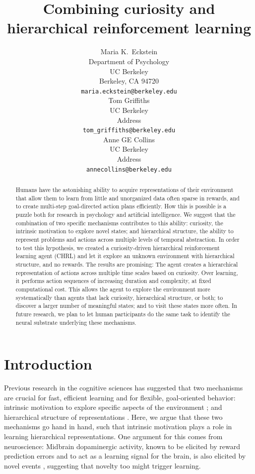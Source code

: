 \documentclass{article}
\title{Combining curiosity and hierarchical reinforcement learning}
\author{
  Maria K.~Eckstein \\
  Department of Psychology \\
  UC Berkeley \\
  Berkeley, CA 94720 \\
  \texttt{maria.eckstein@berkeley.edu} \\  
  \And
  Tom Griffiths \\
  UC Berkeley \\
  Address \\
  \texttt{tom_griffiths@berkeley.edu} \\
  \And
  Anne GE Collins \\
  UC Berkeley \\
  Address \\
  \texttt{annecollins@berkeley.edu} \\
}
\begin{document}
\maketitle

\begin{abstract}
    Humans have the astonishing ability to acquire representations of their environment that allow them to learn from little and unorganized data often sparse in rewards, and to create multi-step goal-directed action plans efficiently. How this is possible is a puzzle both for research in psychology and artificial intelligence. We suggest that the combination of two specific mechanisms contributes to this ability: curiosity, the intrinsic motivation to explore novel states; and hierarchical structure, the ability to represent problems and actions across multiple levels of temporal abstraction. In order to test this hypothesis, we created a curiosity-driven hierarchical reinforcement learning agent (CHRL) and let it explore an unknown environment with hierarchical structure, and no rewards. The results are promising: The agent creates a hierarchical representation of actions across multiple time scales based on curiosity. Over learning, it performs action sequences of increasing duration and complexity, at fixed computational cost. This allows the agent to explore the environment more systematically than agents that lack curiosity, hierarchical structure, or both; to discover a larger number of meaningful states; and to visit these states more often. In future research, we plan to let human participants do the same task to identify the neural substrate underlying these mechanisms.
\end{abstract}


\section{Introduction}

Previous research in the cognitive sciences has suggested that two mechanisms are crucial for fast, efficient learning and for flexible, goal-oriented behavior: intrinsic motivation to explore specific aspects of the environment \cite{gopnik_scientific_2012, schmidhuber_formal_2010, lepper_undermining_1973}; and hierarchical structure of representations \cite{collins_reasoning_2012, anderson_act:_1996, miller_integrative_2001, frank_mechanisms_2012, chase_perception_1973, botvinick_model-based_2014}. Here, we argue that these two mechanisms go hand in hand, such that intrinsic motivation plays a role in learning hierarchical representations. One argument for this comes from neuroscience: Midbrain dopaminergic activity, known to be elicited by reward prediction errors \cite{schultz_neural_1997} and to act as a learning signal for the brain, is also elicited by novel events \cite{wittmann_striatal_2008}, suggesting that novelty too might trigger learning.
\end{document}
